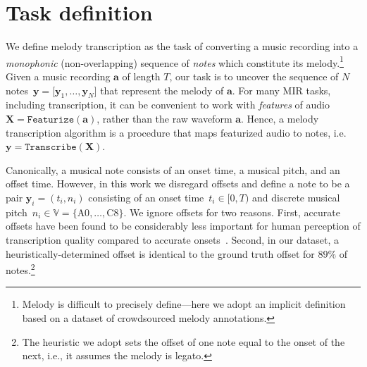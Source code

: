 \section{Task definition}
\label{sec:task}

We define melody transcription as the task of converting a music recording into a \emph{monophonic} (non-overlapping) sequence of \emph{notes} which constitute its melody.\footnote{Melody is difficult to precisely define---here we adopt an implicit definition based on a dataset of crowdsourced melody annotations.} Given a music recording $\bm{a}$ of length $T$, our task is to 
uncover 
the sequence of $N$ notes~${\bm{y} = [\bm{y}_1,\dots,\bm{y}_N}]$ that represent the melody of $\bm{a}$.  For many MIR tasks, including transcription, it can be convenient to work with \emph{features} of audio ${\bm{X} = \texttt{Featurize}(\bm{a})}$, rather than the raw waveform $\bm{a}$. 
Hence, a melody transcription algorithm is a procedure that maps featurized audio to notes, i.e.~${\bm{y} = \texttt{Transcribe}(\bm{X})}$. 


Canonically, a musical note consists of an onset time, a musical pitch, and an offset time. 
However, in this work  
we disregard offsets and define a note to be a pair $\bm{y}_i = (t_i,n_i)$ consisting of an onset time~${t_i \in [0,T)}$ and discrete musical pitch~${n_i \in \mathbb{V} = \{\text{A0}, \ldots, \text{C8}\}}$.
We ignore offsets for 
two reasons. 
First, accurate offsets have been found to be considerably less important for human perception of transcription quality compared to accurate onsets~\cite{ycart2020investigating}. 
Second, in our dataset,
a heuristically-determined offset is identical to the ground truth offset for $89\%$ of notes.\footnote{The heuristic we adopt sets the offset of one note equal to the onset of the next, i.e., it assumes the melody is legato.}


